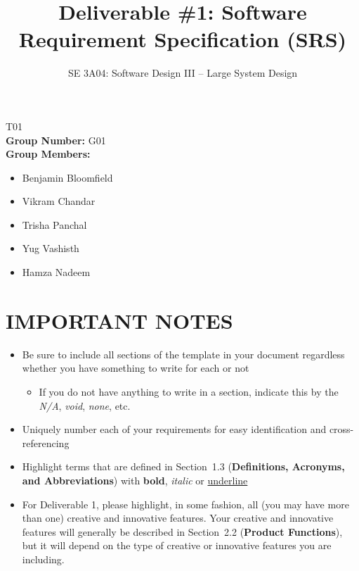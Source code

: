 \documentclass[]{article}
\title{Deliverable \#1: Software Requirement Specification (SRS)}
\author{SE 3A04: Software Design III -- Large System Design}
\date{}
\begin{document}
\maketitle	
{} T01\\
{\bf Group Number:} G01 \\
{\bf Group Members:} 
\begin{itemize}
	\item Benjamin Bloomfield
	\item Vikram Chandar
    \item Trisha Panchal
    \item Yug Vashisth
    \item Hamza Nadeem
\end{itemize}

\section*{IMPORTANT NOTES}
\begin{itemize}
	\item Be sure to include all sections of the template in your document regardless whether you have something to write for each or not
	\begin{itemize}
		\item If you do not have anything to write in a section, indicate this by the \emph{N/A}, \emph{void}, \emph{none}, etc.
	\end{itemize}
	\item Uniquely number each of your requirements for easy identification and cross-referencing
	\item Highlight terms that are defined in Section~1.3 (\textbf{Definitions, Acronyms, and Abbreviations}) with \textbf{bold}, \emph{italic} or \underline{underline}
	\item For Deliverable 1, please highlight, in some fashion, all (you may have more than one) creative and innovative features. Your creative and innovative features will generally be described in Section~2.2 (\textbf{Product Functions}), but it will depend on the type of creative or innovative features you are including.
\end{itemize}

\newpage
\end{document}
